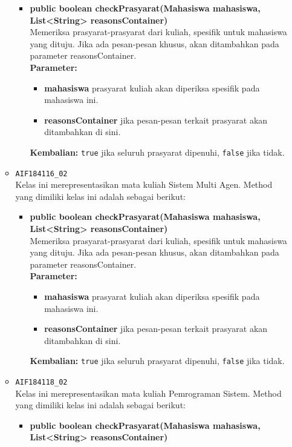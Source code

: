 \begin{enumerate}
\begin{itemize}
		\begin{itemize}
			\item \textbf{public boolean checkPrasyarat(Mahasiswa mahasiswa, List<String> reasonsContainer)}\\
			Memeriksa prasyarat-prasyarat dari kuliah, spesifik untuk mahasiswa yang dituju. Jika ada pesan-pesan khusus, akan ditambahkan pada parameter reasonsContainer.\\
			\textbf{Parameter:}
			\begin{itemize}
				\item \textbf{mahasiswa} prasyarat kuliah akan diperiksa spesifik pada mahasiswa ini.
				\item \textbf{reasonsContainer} jika pesan-pesan terkait prasyarat akan ditambahkan di sini.
			\end{itemize}
			\textbf{Kembalian:} \texttt{true} jika seluruh prasyarat dipenuhi, \texttt{false} jika tidak.
		\end{itemize}
		\item \texttt{AIF184116\_02} \\
		Kelas ini merepresentasikan mata kuliah Sistem Multi Agen. Method yang dimiliki kelas ini adalah sebagai berikut: 
		\begin{itemize}
			\item \textbf{public boolean checkPrasyarat(Mahasiswa mahasiswa, List<String> reasonsContainer)}\\
			Memeriksa prasyarat-prasyarat dari kuliah, spesifik untuk mahasiswa yang dituju. Jika ada pesan-pesan khusus, akan ditambahkan pada parameter reasonsContainer.\\
			\textbf{Parameter:}
			\begin{itemize}
				\item \textbf{mahasiswa} prasyarat kuliah akan diperiksa spesifik pada mahasiswa ini.
				\item \textbf{reasonsContainer} jika pesan-pesan terkait prasyarat akan ditambahkan di sini.
			\end{itemize}
			\textbf{Kembalian:} \texttt{true} jika seluruh prasyarat dipenuhi, \texttt{false} jika tidak.
		\end{itemize}
		\item \texttt{AIF184118\_02} \\
		Kelas ini merepresentasikan mata kuliah Pemrograman Sistem. Method yang dimiliki kelas ini adalah sebagai berikut: 
		\begin{itemize}
			\item \textbf{public boolean checkPrasyarat(Mahasiswa mahasiswa, List<String> reasonsContainer)}\\

\end{itemize}
\end{itemize}
\end{enumerate}
